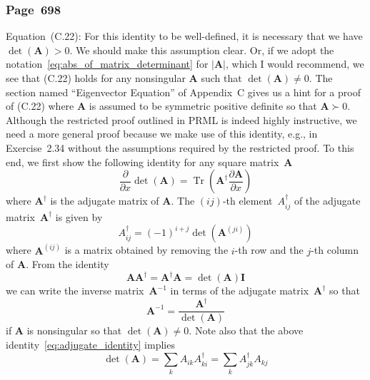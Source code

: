 \documentclass[12pt,a4paper]{article}
\newcommand{\erratum}[1]{%
\subsubsection*{#1}
\addcontentsline{toc}{subsection}{#1}}
\begin{document}
\erratum{Page~698}
Equation~(C.22):
For this identity to be well-defined,
it is necessary that we have $\operatorname{det}(\mathbf{A}) > 0$.
We should make this assumption clear.
Or, if we adopt the notation~\eqref{eq:abs_of_matrix_determinant} for $\left|\mathbf{A}\right|$,
which I would recommend,
we see that (C.22) holds for any nonsingular $\mathbf{A}$ such that
$\operatorname{det}(\mathbf{A}) \neq 0$.
The section named ``Eigenvector Equation'' of Appendix~C gives us a hint for a proof of (C.22)
where $\mathbf{A}$ is assumed to be symmetric positive definite so that $\mathbf{A} \succ 0$.
Although the restricted proof outlined in PRML is indeed highly instructive,
we need a more general proof because we make use of this identity, e.g., in Exercise~2.34
without the assumptions required by the restricted proof.
To this end, we first show the following identity for any square matrix~$\mathbf{A}$
\begin{equation}
\frac{\partial}{\partial x} \operatorname{det}\left(\mathbf{A}\right) =
\operatorname{Tr}\left(\mathbf{A}^{\dagger}\frac{\partial\mathbf{A}}{\partial x}\right)
\label{eq:Jacobi_formula}
\end{equation}
where $\mathbf{A}^{\dagger}$ is the adjugate matrix of
$\mathbf{A}$.
The $(ij)$-th element~$A_{ij}^{\dagger}$ of the adjugate matrix~$\mathbf{A}^{\dagger}$ is given by
\begin{equation}
A_{ij}^{\dagger} = (-1)^{i+j} \operatorname{det}\left(\mathbf{A}^{(ji)}\right)
\label{eq:definition_of_adjugate}
\end{equation}
where $\mathbf{A}^{(ij)}$ is a matrix obtained by removing
the $i$-th row and the $j$-th column of $\mathbf{A}$.
From the identity
\begin{equation}
\mathbf{A}\mathbf{A}^{\dagger} = \mathbf{A}^{\dagger}\mathbf{A} =
\operatorname{det}(\mathbf{A})\mathbf{I}
\label{eq:adjugate_identity}
\end{equation}
we can write the inverse matrix~$\mathbf{A}^{-1}$ in terms of
the adjugate matrix~$\mathbf{A}^{\dagger}$ so that
\begin{equation}
\mathbf{A}^{-1} = \frac{\mathbf{A}^{\dagger}}{\operatorname{det}(\mathbf{A})}
\label{eq:inverse_in_terms_of_adjugate}
\end{equation}
if $\mathbf{A}$ is nonsingular so that $\operatorname{det}(\mathbf{A}) \neq 0$.
Note also that the above identity~\eqref{eq:adjugate_identity} implies
\begin{equation}
\operatorname{det}(\mathbf{A}) =
\sum_{k} A_{ik} A_{ki}^{\dagger} = \sum_{k} A_{jk}^{\dagger} A_{kj}
\label{eq:determinant_expansion}
\end{equation}
\end{document}
